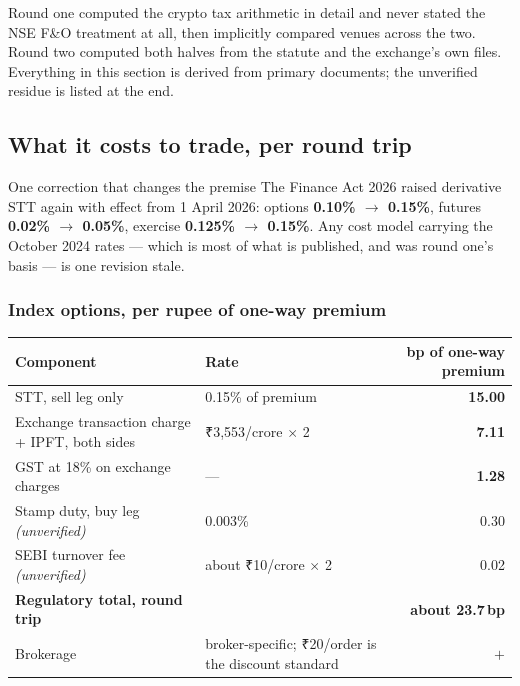 \documentclass[11pt,a4paper]{article}
\newcommand{\rs}{₹}
\begin{document}
Round one computed the crypto tax arithmetic in detail and never stated the NSE
F\&O treatment at all, then implicitly compared venues across the two. Round two
computed both halves from the statute and the exchange's own files. Everything in
this section is derived from primary documents; the unverified residue is listed
at the end.

\subsection{What it costs to trade, per round trip}
\label{sec:coststack}

\begin{keyfact}{One correction that changes the premise}
The Finance Act 2026 raised derivative STT again with effect from 1 April 2026:
options \textbf{0.10\% $\to$ 0.15\%}, futures \textbf{0.02\% $\to$ 0.05\%},
exercise \textbf{0.125\% $\to$ 0.15\%}. Any cost model carrying the October 2024
rates --- which is most of what is published, and was round one's basis --- is one
revision stale.
\end{keyfact}

\subsubsection{Index options, per rupee of one-way premium}

\begin{center}
\begin{tabular}{@{}llr@{}}
\toprule
Component & Rate & bp of one-way premium \\
\midrule
STT, sell leg only & 0.15\% of premium & \textbf{15.00} \\
Exchange transaction charge + IPFT, both sides & \rs 3{,}553/crore $\times$ 2 & \textbf{7.11} \\
GST at 18\% on exchange charges & --- & \textbf{1.28} \\
Stamp duty, buy leg \emph{(unverified)} & 0.003\% & 0.30 \\
SEBI turnover fee \emph{(unverified)} & about \rs 10/crore $\times$ 2 & 0.02 \\
\midrule
\textbf{Regulatory total, round trip} & & \textbf{about 23.7\,bp} \\
Brokerage & broker-specific; \rs 20/order is the discount standard & $+$ \\
\bottomrule
\end{tabular}
\end{center}
\end{document}
